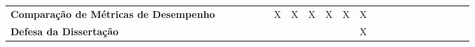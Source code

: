 \begin{table}[!ht]
\begin{adjustbox}{width=1\textwidth}
\begin{tabular}{p{5cm}ccccccccccccccccccccc}
  \textbf{Comparação de Métricas
  de Desempenho}                        &             &             &             &             &             &      X      &      X      &      X      &      X      &      X      &      X      \\
  \textbf{Defesa da Dissertação}     &             &             &             &             &             &             &             &             &             &             &      X      \\
  \bottomrule
\end{tabular}
	\end{adjustbox}
\end{table}
